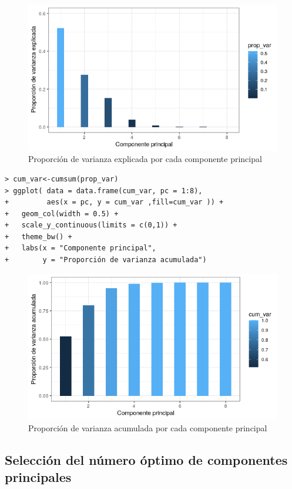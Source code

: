\documentclass[12pt]{article}
\begin{document}
\begin{figure}[H]
  \centering
  \includegraphics[width=120mm]{imgs/prop-var}
  \caption{Proporción de varianza explicada por cada componente principal}
  \label{fig:prop-var}
\end{figure}

\begin{verbatim}
> cum_var<-cumsum(prop_var)
> ggplot( data = data.frame(cum_var, pc = 1:8),
+         aes(x = pc, y = cum_var ,fill=cum_var )) +
+   geom_col(width = 0.5) +
+   scale_y_continuous(limits = c(0,1)) +
+   theme_bw() +
+   labs(x = "Componente principal",
+        y = "Proporción de varianza acumulada")
\end{verbatim}

\begin{figure}[H]
  \centering
  \includegraphics[width=120mm]{imgs/cum-var}
  \caption{Proporción de varianza acumulada por cada componente principal}
  \label{fig:cum-var}
\end{figure}

\pagebreak

\subsection{Selección del número óptimo de componentes principales}
\end{document}
